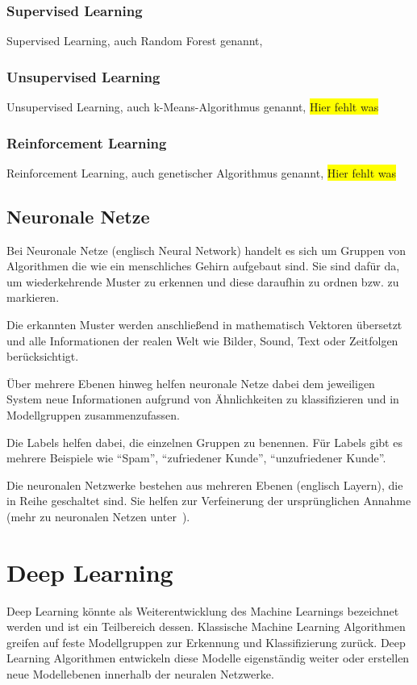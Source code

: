 \subsubsection{Supervised Learning}
Supervised Learning, auch Random Forest genannt,\cite{book_grundlagen_learnings}

\subsubsection{Unsupervised Learning}
Unsupervised Learning, auch k-Means-Algorithmus genannt,\cite{book_grundlagen_learnings}
\colorbox{yellow}{Hier fehlt was}

\subsubsection{Reinforcement Learning}
Reinforcement Learning, auch genetischer Algorithmus genannt,\cite{book_grundlagen_learnings}
\colorbox{yellow}{Hier fehlt was}

\subsection{Neuronale Netze}
Bei Neuronale Netze (englisch Neural Network) handelt es sich um Gruppen von Algorithmen die wie ein menschliches Gehirn
aufgebaut sind. Sie sind dafür da, um wiederkehrende Muster zu erkennen und diese daraufhin zu ordnen bzw. zu markieren.

Die erkannten Muster werden anschließend in mathematisch Vektoren übersetzt und alle Informationen der realen Welt wie
Bilder, Sound, Text oder Zeitfolgen berücksichtigt.

Über mehrere Ebenen hinweg helfen neuronale Netze dabei dem jeweiligen System neue Informationen aufgrund von
Ähnlichkeiten zu klassifizieren und in Modellgruppen zusammenzufassen.

Die Labels helfen dabei, die einzelnen Gruppen zu benennen. Für Labels gibt es mehrere Beispiele wie \enquote{Spam},
\enquote{zufriedener Kunde}, \enquote{unzufriedener Kunde}.

Die neuronalen Netzwerke bestehen aus mehreren Ebenen (englisch Layern), die in Reihe geschaltet sind. Sie helfen zur
Verfeinerung der ursprünglichen Annahme (mehr zu neuronalen Netzen unter~\cite{book_grundlagen_neuronalenetze}).

\section{Deep Learning}
Deep Learning könnte als Weiterentwicklung des Machine Learnings bezeichnet werden und ist ein Teilbereich dessen.
Klassische Machine Learning Algorithmen greifen auf feste Modellgruppen zur Erkennung und Klassifizierung zurück. Deep
Learning Algorithmen entwickeln diese Modelle eigenständig weiter oder erstellen neue Modellebenen innerhalb der
neuralen Netzwerke.

